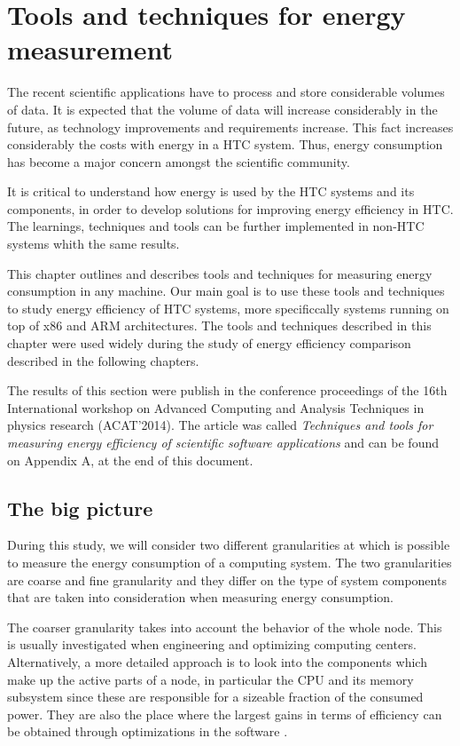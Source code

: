 \chapter{Tools and techniques for energy measurement}


The recent scientific applications have to process and store
considerable volumes of data. It is expected that the volume of
data will increase considerably in the future, as technology improvements and
requirements increase. This fact increases considerably
the costs with energy in a HTC system. Thus, energy consumption has
become a major concern amongst the scientific community.

It is critical to understand how energy is used by the HTC systems and its components, in order to develop solutions for improving energy efficiency in HTC. The learnings, techniques and tools can be further implemented in non-HTC systems whith the same results.

This chapter outlines and describes tools and techniques for measuring energy consumption in any machine. Our main goal is to use these tools and techniques to study energy efficiency of HTC systems, more specificcally systems running on top of x86 and ARM architectures. The tools and techniques described in this chapter were used widely during the study of energy efficiency comparison described in the following chapters. 


The results of this section were publish in the conference proceedings of the 16th International workshop on Advanced Computing and Analysis Techniques in physics research (ACAT'2014). The article was called \textit{Techniques and tools for measuring energy efficiency of scientific software applications} \cite{ACAT} and can be found on Appendix A, at the end of this document. 

\section*{The big picture}

During this study, we will consider two different granularities at which is possible to measure the energy consumption of a computing system. The two granularities are coarse and fine granularity and they differ on the type of system components that are taken into consideration when measuring energy consumption.

The coarser granularity takes into account the behavior of the whole node. This is usually investigated when
engineering and optimizing computing centers. Alternatively, a more detailed approach is to
look into the components which make up the active parts of a
node, in particular the CPU and its memory subsystem since these
are responsible for a sizeable fraction of the consumed power.
They are also the place where the largest gains in terms of efficiency 
can be obtained through optimizations in the software \cite{ACAT}.

